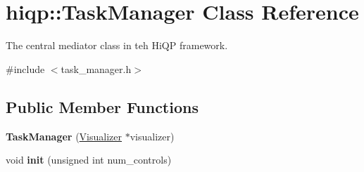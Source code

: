 \hypertarget{classhiqp_1_1TaskManager}{\section{hiqp\-:\-:Task\-Manager Class Reference}
\label{classhiqp_1_1TaskManager}
}


The central mediator class in teh Hi\-Q\-P framework.  




{\ttfamily \#include $<$task\-\_\-manager.\-h$>$}

\subsection*{Public Member Functions}
\begin{DoxyCompactItemize}
\item 
\hypertarget{classhiqp_1_1TaskManager_a79ce349f194b18d0fb6177dde0903b2b}{{\bfseries Task\-Manager} (\hyperlink{classhiqp_1_1Visualizer}{Visualizer} $\ast$visualizer)}\label{classhiqp_1_1TaskManager_a79ce349f194b18d0fb6177dde0903b2b}

\item 
\hypertarget{classhiqp_1_1TaskManager_a640c2adc882769f691557a7ffd9c6cab}{void {\bfseries init} (unsigned int num\-\_\-controls)}\label{classhiqp_1_1TaskManager_a640c2adc882769f691557a7ffd9c6cab}


\end{DoxyCompactItemize}
